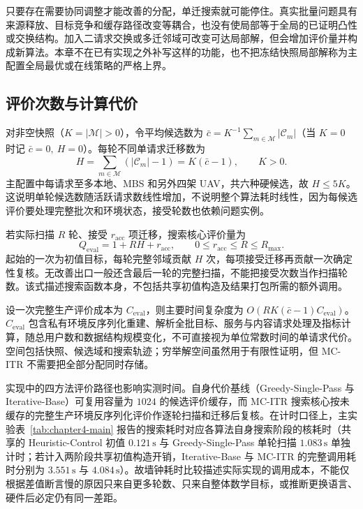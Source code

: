 只要存在需要协同调整才能改善的分配，单迁搜索就可能停住。真实批量问题具有来源释放、目标竞争和缓存路径改变等耦合，也没有使局部等于全局的已证明凸性或交换结构。加入二请求交换或多迁邻域可改变可达局部解，但会增加评价量并构成新算法。本章不在已有实现之外补写这样的功能，也不把冻结快照局部解称为主配置全局最优或在线策略的严格上界。

\subsection{评价次数与计算代价}
\label{sec:ch4-complexity}

对非空快照（$K=|\mathcal{M}|>0$），令平均候选数为 $\bar c=K^{-1}\sum_{m\in\mathcal{M}}|\mathcal C_m|$（当 $K=0$ 时记 $\bar c=0,\ H=0$）。每轮不同单请求迁移数为
\begin{equation}
 H=\sum_{m\in\mathcal{M}}(|\mathcal C_m|-1)=K(\bar c-1),\qquad K>0.
 \label{eq:ch4-neighbor-count}
\end{equation}
主配置中每请求至多本地、MBS 和另外四架 UAV，共六种硬候选，故 $H\leq5K$。这说明单轮候选数随活跃请求数线性增加，不说明整个算法耗时线性，因为每候选评价要处理完整批次和环境状态，接受轮数也依赖问题实例。

若实际扫描 $R$ 轮、接受 $r_{\mathrm{acc}}$ 项迁移，搜索核心评价量为
\begin{equation}
 Q_{\mathrm{eval}}=1+RH+r_{\mathrm{acc}},\qquad
 0\leq r_{\mathrm{acc}}\leq R\leq R_{\max}.
 \label{eq:ch4-evaluation-count}
\end{equation}
起始的一次为初值目标，每轮完整邻域贡献 $H$ 次，每项接受迁移再贡献一次确定性复核。无改善出口一般还含最后一轮的完整扫描，不能把接受次数当作扫描轮数。该式描述搜索函数本身，不包括共享初值构造及结果打包所需的额外调用。

设一次完整生产评价成本为 $C_{\mathrm{eval}}$，则主要时间复杂度为 $O(RK(\bar c-1)C_{\mathrm{eval}})$。$C_{\mathrm{eval}}$ 包含私有环境反序列化重建、解析全批目标、服务与内容请求处理及指标计算，随总用户数和数据结构规模变化，不可直接视为单位常数时间的单请求代价。空间包括快照、候选域和搜索轨迹；穷举解空间虽然用于有限性证明，但 MC-ITR 不需要把全部分配同时存储。

实现中的四方法评价路径也影响实测时间。自身代价基线（Greedy-Single-Pass 与 Iterative-Base）可复用容量为 $1024$ 的候选评价缓存，而 MC-ITR 搜索核心按未缓存的完整生产环境反序列化评价作逐轮扫描和迁移后复核。在计时口径上，主实验表~\ref{tab:chapter4-main} 报告的搜索耗时对应各算法自身搜索阶段的核耗时（共享的 Heuristic-Control 初值 $0.121\,\mathrm{s}$ 与 Greedy-Single-Pass 单轮扫描 $1.083\,\mathrm{s}$ 单独计时；若计入两阶段共享初值构造开销，Iterative-Base 与 MC-ITR 的完整调用耗时分别为 $3.551\,\mathrm{s}$ 与 $4.084\,\mathrm{s}$）。故墙钟耗时比较描述实际实现的调用成本，不能仅根据差值断言慢的原因只来自更多轮数、只来自整体数学目标，或推断更换语言、硬件后必定仍有同一差距。

